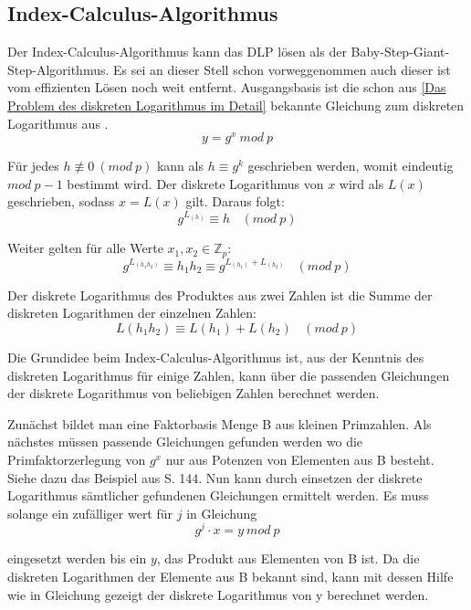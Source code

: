 	\subsection{Index-Calculus-Algorithmus}
		Der Index-Calculus-Algorithmus kann das DLP  lösen als der Baby-Step-Giant-Step-Algorithmus. Es sei an dieser Stell schon vorweggenommen auch dieser ist vom effizienten Lösen noch weit entfernt. Ausgangsbasis ist die schon aus \ref{Das Problem des diskreten Logarithmus im Detail} bekannte Gleichung  zum diskreten Logarithmus aus \myZPStern.
		\begin{equation}
			y = g^x~mod~p
			\label{Gleichung Diskreten Logarithmus aus ZPStern}
		\end{equation}
		
		Für jedes $h \not\equiv 0~(mod~p)$ kann als $h \equiv g^k$ geschrieben werden, womit eindeutig $mod~p - 1$ bestimmt wird. Der diskrete Logarithmus von $x$ wird als $L(x)$ geschrieben, sodass $x = L(x)$ gilt. Daraus folgt:
		\begin{equation}
			g^{L_{(h)}} \equiv h~~~~(mod~p)
			\label{Gleichung Diskreten Logarithmus äquivalent}
		\end{equation}
		
		Weiter gelten für alle Werte $x_1, x_2 \in \mathbb{Z}_p$:
		\begin{equation}
			g^{L_{(h_1 h_2)}} \equiv h_1 h_2 \equiv g^{L_{(h_1)} + L_{(h_2)}}~~~~(mod~p)
		\end{equation}
		
		Der diskrete Logarithmus des Produktes aus zwei Zahlen ist die Summe der diskreten Logarithmen der einzelnen Zahlen:
		\begin{equation}
			L(h_1 h_2) \equiv L(h_1) + L(h_2)~~~~(mod~p)
		\end{equation}
		
		Die Grundidee beim Index-Calculus-Algorithmus ist, aus der Kenntnis des diskreten Logarithmus für einige Zahlen, kann über die passenden Gleichungen der diskrete Logarithmus von beliebigen Zahlen berechnet werden.
		
		Zunächst bildet man eine Faktorbasis Menge B aus kleinen Primzahlen. Als nächstes müssen passende Gleichungen gefunden werden wo die Primfaktorzerlegung von $g^x$ nur aus Potenzen von Elementen aus B besteht. Siehe dazu das Beispiel aus \cite{Elliptic:Curves:Number:Theory:and:Cryptography} S. 144. Nun kann durch einsetzen der diskrete Logarithmus sämtlicher gefundenen Gleichungen ermittelt werden. Es muss solange ein zufälliger wert für $j$ in Gleichung
		\begin{equation}
			g^j \cdot x = y~mod~p
			\label{Gleichung Diskreten Logarithmus Gleichung 2}
		\end{equation}
		
		eingesetzt werden bis ein $y$, das Produkt aus Elementen von B ist. Da die diskreten Logarithmen der Elemente aus B bekannt sind, kann mit dessen Hilfe wie in Gleichung  gezeigt der diskrete Logarithmus von y berechnet werden.